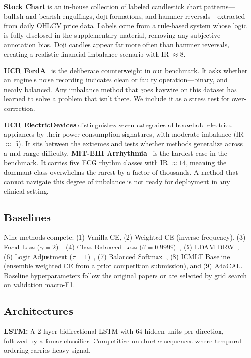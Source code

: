 \documentclass[letterpaper]{article}
\begin{document}
\textbf{Stock Chart} is an in-house collection of labeled candlestick chart patterns---bullish and bearish engulfings, doji formations, and hammer reversals---extracted from daily OHLCV price data. Labels come from a rule-based system whose logic is fully disclosed in the supplementary material, removing any subjective annotation bias. Doji candles appear far more often than hammer reversals, creating a realistic financial imbalance scenario with IR $\approx 8$.

\textbf{UCR FordA}~\citep{dau2018ucr} is the deliberate counterweight in our benchmark. It asks whether an engine's noise recording indicates clean or faulty operation---binary, and nearly balanced. Any imbalance method that goes haywire on this dataset has learned to solve a problem that isn't there. We include it as a stress test for over-correction.

\textbf{UCR ElectricDevices} distinguishes seven categories of household electrical appliances by their power consumption signatures, with moderate imbalance (IR $\approx$ 5). It sits between the extremes and tests whether methods generalize across a mid-range difficulty. \textbf{MIT-BIH Arrhythmia}~\citep{moody2001mitbih} is the hardest case in the benchmark. It carries five ECG rhythm classes with IR $\approx 14$, meaning the dominant class overwhelms the rarest by a factor of thousands. A method that cannot navigate this degree of imbalance is not ready for deployment in any clinical setting.

\subsection{Baselines}

Nine methods compete: (1) Vanilla CE, (2) Weighted CE (inverse-frequency), (3) Focal Loss ($\gamma=2$)~\citep{lin2017focal}, (4) Class-Balanced Loss ($\beta=0.9999$)~\citep{cui2019class}, (5) LDAM-DRW~\citep{cao2019ldam}, (6) Logit Adjustment ($\tau=1$)~\citep{menon2021logit}, (7) Balanced Softmax~\citep{ren2020balanced}, (8) ICMLT Baseline (ensemble weighted CE from a prior competition submission), and (9) AdaCAL. Baseline hyperparameters follow the original papers or are selected by grid search on validation macro-F1.

\subsection{Architectures}

\textbf{LSTM:} A 2-layer bidirectional LSTM with 64 hidden units per direction, followed by a linear classifier. Competitive on shorter sequences where temporal ordering carries heavy signal.
\end{document}
